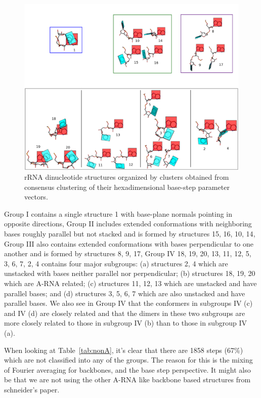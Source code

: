 \begin{figure}[htbp]
 \centering
\includegraphics[angle=90, scale=0.5]{Chapter2/collageb.png}
 \caption{rRNA dinucleotide structures organized by clusters obtained from
consensus clustering of their hexadimensional base-step parameter vectors.}
 \label{fig:nonAclus}
\end{figure}

Group I  contains a single structure {1}  with base-plane normals
pointing   in  opposite   directions,  Group   II   includes  extended
conformations with neighboring bases  roughly parallel but not stacked
and is formed by structures {15,  16, 10, 14}, Group III also contains
extended conformations with bases  perpendicular to one another and is
formed by structures {8, 9, 17}, Group  IV {18, 19, 20, 13, 11, 12, 5,
  3, 6, 7, 2, 4} contains  four major subgroups: (a) structures {2, 4}
which are unstacked with bases neither parallel nor perpendicular; (b)
structures {18, 19,  20} which are A-RNA related; (c) structures {11,
  12,  13}  which are  unstacked  and  have  parallel bases;  and  (d)
structures {3,  5, 6,  7} which are  also unstacked and  have parallel
bases. We also see in Group IV that the conformers in subgroups IV (c)
and  IV (d)  are closely  related  and that  the dimers  in these  two
subgroups are more closely related to those in subgroup IV (b) than to
those in subgroup IV (a).

When looking at Table~\ref{tab:nonA}, it's clear that there are 1858
steps (67\%) which are not classified into any of the groups. The reason for
this is the mixing of Fourier averaging for backbones, and the
base step perspective. It might also be that we are not using the
other A-RNA like backbone based structures from schneider's paper.

